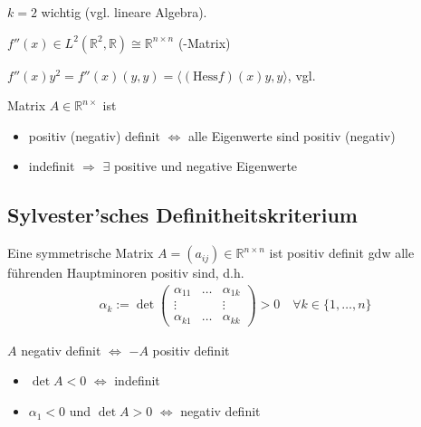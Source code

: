 \begin{underlinedenvironment}
	$k=2$ wichtig (vgl. lineare Algebra).
	
	$f''(x) \in L^2(\mathbb{R}^2,\mathbb{R})\cong \mathbb{R}^{n\times n}$ (-Matrix)
	
	$f''(x) y^2 = f''(x) (y,y) = \langle (\mathrm{Hess} f)(x)y, y\rangle$, vgl. 
	
	Matrix $A\in\mathbb{R}^{n\times}$ ist \begin{itemize}
		\item positiv (negativ) definit $\Leftrightarrow$ alle Eigenwerte sind positiv (negativ) 
		\item indefinit $\Rightarrow$ $\exists$ positive und negative Eigenwerte
	\end{itemize}
\end{underlinedenvironment}

\subsection{Sylvester'sches Definitheitskriterium}
Eine symmetrische Matrix $A=(a_{ij})\in\mathbb{R}^{n\times n}$ ist positiv definit \gls{gdw} alle führenden Hauptminoren positiv sind, d.h. \begin{align*}
	\alpha_k := \det\begin{pmatrix}
		\alpha_{11} & \dots & \alpha_{1k} \\ \vdots && \vdots \\ \alpha_{k1} & \dots & \alpha_{kk}
	\end{pmatrix} > 0\quad\forall k\in\{1,\dotsc,n\}
\end{align*}

\begin{underlinedenvironment}[beachte]
	$A$ negativ definit $\Leftrightarrow$ $-A$ positiv definit
\end{underlinedenvironment}
\begin{underlinedenvironment}[Spezialfall $n=2$]\vspace*{0pt}
	\begin{itemize}[topsep=\dimexpr-\baselineskip/2\relax]
		\item $\det A <0 $ $\Leftrightarrow$ indefinit
		\item $\alpha_1 < 0$ und $\det A > 0$ $\Leftrightarrow$ negativ definit
	\end{itemize}
\end{underlinedenvironment}


